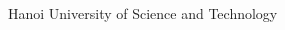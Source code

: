 \renewcommand\refname{Tài liệu tham khảo}
\begin{thebibliography}{xx}

Hanoi University of Science and Technology
\end{thebibliography}
